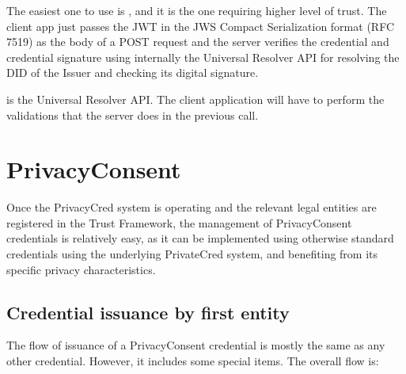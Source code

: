 \documentclass[a4paper,12pt,english,openany]{sphinxmanual}
\begin{document}
\sphinxAtStartPar
The easiest one to use is , and it is the one requiring higher level of trust. The client app just passes the JWT in the JWS Compact Serialization format (RFC 7519) as the body of a POST request and the server verifies the credential and credential signature using internally the Universal Resolver API for resolving the DID of the Issuer and checking its digital signature.

\sphinxAtStartPar
{} is the Universal Resolver API. The client application will have to perform the validations that the server does in the previous call.


\chapter{PrivacyConsent}
\label{\detokenize{privacyconsent:privacyconsent}}\label{\detokenize{privacyconsent::doc}}
\sphinxAtStartPar
Once the PrivacyCred system is operating and the relevant legal entities are registered in the Trust Framework, the management of PrivacyConsent credentials is relatively easy, as it can be implemented using otherwise standard credentials using the underlying PrivateCred system, and benefiting from its specific privacy characteristics.


\section{Credential issuance by first entity}
\label{\detokenize{privacyconsent:credential-issuance-by-first-entity}}
\sphinxAtStartPar
The flow of issuance of a PrivacyConsent credential is mostly the same as any other credential. However, it includes some special items. The overall flow is:
\end{document}
